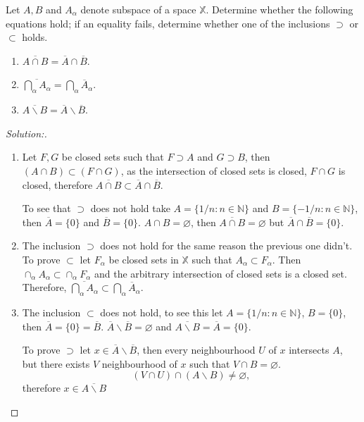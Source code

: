 \documentclass[a4paper,12pt, reqno]{article}
\theoremstyle{definition}
\newenvironment{exerr}[1]{
  \renewcommand\theexeralt{#1}
  \exeralt
}{\endexeralt}
\newenvironment{solution}{\begin{proof}[Solution:]}{\end{proof}}
\newcommand{\N}{\mathbb{N}}
\newcommand{\X}{\mathbb{X}}
\begin{document}
\begin{exerr}{8}
  Let $A,B$ and $A_{\alpha}$ denote subspace of a space $\X$. Determine whether the following equations hold; if an equality fails, determine whether one of the inclusions $\supset$ or $\subset$ holds.
  \begin{enumerate}[label=(\alph*)]
    \item $\overline{A\cap B} = \overline{A}\cap \overline{B}$.
    \item $\overline{\bigcap_{\alpha}A_{\alpha}} = \bigcap_{\alpha}\overline{A}_{\alpha}$.
    \item $\overline{A\backslash B} = \overline{A}\backslash \overline{B}$.
  \end{enumerate}
\end{exerr}

\begin{solution}\hfill
  \begin{enumerate}[label=(\alph*)]
    \item Let $F,G$ be closed sets such that $F\supset A$ and $G\supset B$, then $(A\cap B)\subset(F\cap G)$, as the intersection of closed sets is closed, $F\cap G$ is closed, therefore $\overline{A\cap B} \subset \overline{A}\cap \overline{B}$.

          To see that $\supset$ does not hold take $A = \{ 1/n : n\in\N  \}$ and $B = \{ -1/n : n\in\N \}$, then $\overline{A} = \{ 0 \}$ and $\overline{B} = \{ 0 \}$. $A\cap B = \varnothing$, then $\overline{A\cap B} = \varnothing$ but $\overline{A}\cap \overline{B} = \{ 0 \}$.
    \item The inclusion $\supset$ does not hold for the same reason the previous one didn't. To prove $\subset$ let $F_{\alpha}$ be closed sets in $\X$ such that $A_{\alpha}\subset F_{\alpha}$. Then $\cap_{\alpha}A_{\alpha}\subset\cap_{\alpha}F_{\alpha}$ and the arbitrary intersection of closed sets is a closed set. Therefore, $\overline{\bigcap_{\alpha}A_{\alpha}} \subset \bigcap_{\alpha}\overline{A}_{\alpha}$.
    \item The inclusion $\subset$ does not hold, to see this let $A = \{ 1/n : n\in\N \}$, $B =\{ 0 \}$, then $\overline{A} = \{ 0 \} = \overline{B}$. $\overline{A}\backslash \overline{B} = \varnothing$ and $\overline{A\backslash B} = \overline{A} = \{ 0 \}$.

          To prove $\supset$ let $x\in \overline{A}\backslash \overline{B}$, then every neighbourhood $U$ of $x$ intersects $A$, but there exists $V$ neighbourhood of $x$ such that $V\cap B=\varnothing$.
          \begin{equation*}
            (V\cap U)\cap(A\backslash B) \neq \varnothing,
          \end{equation*}
          therefore $x\in \overline{A\backslash B}$
  \end{enumerate}
\end{solution}
\end{document}
